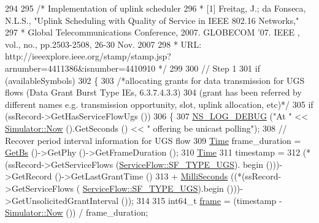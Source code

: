 \begin{DoxyCode}
294 
295               \textcolor{comment}{/* Implementation of uplink scheduler}
296 \textcolor{comment}{               * [1] Freitag, J.; da Fonseca, N.L.S., "Uplink Scheduling with Quality of Service in IEEE
       802.16 Networks,"}
297 \textcolor{comment}{               * Global Telecommunications Conference, 2007. GLOBECOM '07. IEEE , vol., no., pp.2503-2508,
       26-30 Nov. 2007}
298 \textcolor{comment}{               * URL: http://ieeexplore.ieee.org/stamp/stamp.jsp?arnumber=4411386&isnumber=4410910 */}
299 
300               \textcolor{comment}{// Step 1}
301               \textcolor{keywordflow}{if} (availableSymbols)
302                 \{
303                   \textcolor{comment}{/*allocating grants for data transmission for UGS flows (Data Grant Burst Type IEs,
       6.3.7.4.3.3)}
304 \textcolor{comment}{                   (grant has been referred by different names e.g. transmission opportunity, slot,        
       uplink allocation, etc)*/}
305                   \textcolor{keywordflow}{if} (ssRecord->GetHasServiceFlowUgs ())
306                     \{
307                       \hyperlink{group__logging_ga413f1886406d49f59a6a0a89b77b4d0a}{NS\_LOG\_DEBUG} (\textcolor{stringliteral}{"At "} << \hyperlink{classns3_1_1Simulator_ac3178fa975b419f7875e7105be122800}{Simulator::Now} ().GetSeconds () << \textcolor{stringliteral}{"
       offering be unicast polling"});
308                       \textcolor{comment}{// Recover period interval information for UGS flow}
309                       \hyperlink{namespacens3_1_1TracedValueCallback_a7ffd3e7c142ffe7c8a1d2db9b8de38ec}{Time} frame\_duration = \hyperlink{classns3_1_1UplinkScheduler_afe61b7de71d92d2dff1b135744a6ff7e}{GetBs} ()->GetPhy ()->GetFrameDuration ();
310                       \hyperlink{namespacens3_1_1TracedValueCallback_a7ffd3e7c142ffe7c8a1d2db9b8de38ec}{Time}
311                         timestamp =
312                         (*(ssRecord->GetServiceFlows (\hyperlink{classns3_1_1ServiceFlow_a7990ba10be1e098328fd1e6382a26235a969e0b62fa12fef1dbb23913744ed594}{ServiceFlow::SF\_TYPE\_UGS}).
      begin ()))->GetRecord ()->GetLastGrantTime ()
313                         + \hyperlink{group__timecivil_gaf26127cf4571146b83a92ee18679c7a9}{MilliSeconds} ((*(ssRecord->GetServiceFlows (
      \hyperlink{classns3_1_1ServiceFlow_a7990ba10be1e098328fd1e6382a26235a969e0b62fa12fef1dbb23913744ed594}{ServiceFlow::SF\_TYPE\_UGS}).begin ()))->GetUnsolicitedGrantInterval ());
314 
315                       int64\_t \hyperlink{namespacevisualizer_1_1higcontainer_a3a06b62552347e51aaf4765391802719}{frame} = (timestamp - \hyperlink{classns3_1_1Simulator_ac3178fa975b419f7875e7105be122800}{Simulator::Now} ()) / frame\_duration;

\end{DoxyCode}
